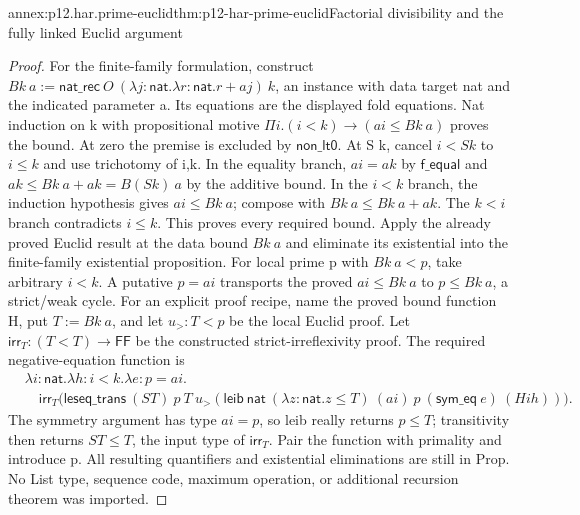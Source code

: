 \begin{annexitem}{annex:p12.har.prime-euclid}{thm:p12-har-prime-euclid}{Factorial divisibility and the fully linked Euclid argument}
\begin{proof}
For the finite-family formulation, construct
\(B k\ a:=\mathsf{nat\_rec}\ O\
(\lambda j:\mathsf{nat}.\lambda r:\mathsf{nat}.r+a j)\ k\),
an instance with data target nat and the indicated parameter a.
Its equations are the displayed fold equations. Nat induction on k
with propositional motive
\(\Pi i.(i<k)\to(a i\le B k\ a)\) proves the bound.
At zero the premise is excluded by \(\mathsf{non\_lt0}\).
At S k, cancel \(i<S k\) to \(i\le k\) and use trichotomy of
i,k. In the equality branch, \(a i=a k\) by \(\mathsf{f\_equal}\) and
\(a k\le B k\ a+a k=B(S k)\ a\) by the additive bound.
In the \(i<k\) branch, the induction hypothesis gives
\(a i\le B k\ a\); compose with
\(B k\ a\le B k\ a+a k\). The \(k<i\) branch contradicts
\(i\le k\). This proves every required bound.
Apply the already proved Euclid result at the data bound \(B k\ a\)
and eliminate its existential into the finite-family existential
proposition. For local prime p with \(B k\ a<p\), take arbitrary
\(i<k\). A putative \(p=a i\) transports the proved
\(a i\le B k\ a\) to \(p\le B k\ a\), a strict/weak cycle.
For an explicit proof recipe, name the proved bound function H,
put \(T:=B k\ a\), and let \(u_{>}:T<p\) be the local Euclid
proof. Let \(\mathsf{irr}_T:(T<T)\to\mathsf{FF}\) be the constructed
strict-irreflexivity proof. The required negative-equation function is
\[
\begin{aligned}
 &\lambda i:\mathsf{nat}.\lambda h:i<k.\lambda e:p=a i.\\
 &\quad\mathsf{irr}_T\bigl(
  \mathsf{leseq\_trans}\ (S T)\ p\ T\ u_{>}
   (\mathsf{leib}\ \mathsf{nat}\ (\lambda z:\mathsf{nat}.z\le T)
       \ (a i)\ p\ (\mathsf{sym\_eq}\ e)\ (H i h))\bigr).
\end{aligned}
\]
The symmetry argument has type \(a i=p\), so leib really returns
\(p\le T\); transitivity then returns \(S T\le T\), the input
type of \(\mathsf{irr}_T\). Pair the function with primality and
introduce p. All resulting quantifiers
and existential eliminations are still in Prop. No List type, sequence
code, maximum operation, or additional recursion theorem was imported.
\end{proof}
\end{annexitem}
